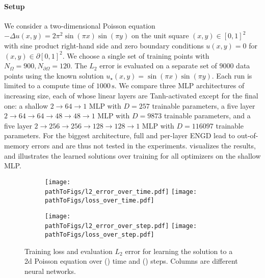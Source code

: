 \paragraph{Setup} We consider a two-dimensional Poisson equation $-\Delta u(x, y) = 2 \pi^2 \sin(\pi x) \sin(\pi y)$ on the unit square $(x,y) \in [0, 1]^2$ with sine product right-hand side and zero boundary conditions $u(x, y) = 0$ for $(x,y) \in \partial [0,1]^2$.
We choose a single set of training points with $N_{\Omega} = 900, N_{\partial\Omega} = 120$.
The $L_2$ error is evaluated on a separate set of $\num{9000}$ data points using the known solution $u_{\star}(x, y) = \sin(\pi x) \sin(\pi y)$.
Each run is limited to a compute time of $\num{1000}\,\text{s}$.
We compare three MLP architectures of increasing size, each of whose linear layers are Tanh-activated except for the final one: a shallow $2\to 64\to 1$ MLP with $D=257$ trainable parameters, a five layer $2 \to 64 \to 64 \to 48 \to 48 \to 1$ MLP with $D=\num{9873}$ trainable parameters, and a five layer $2 \to 256 \to 256\to 128 \to 128 \to 1$ MLP with $D=\num{116097}$ trainable parameters.
For the biggest architecture, full and per-layer ENGD lead to out-of-memory errors and are thus not tested in the experiments.
 visualizes the results, and  illustrates the learned solutions over training for all optimizers on the shallow MLP.

\begin{figure}[!h]
  \centering
  \def\pathToFigs{kfac_pinns_exp/exp17_groupplot_poisson2d}
  \begin{subfigure}[t]{1.0\linewidth}
    \caption{}\label{subfig:poisson2d-time}
    \texttt{[image: \\pathToFigs/l2\_error\_over\_time.pdf]}
    \texttt{[image: \\pathToFigs/loss\_over\_time.pdf]}
  \end{subfigure}
  \begin{subfigure}[t]{1.0\linewidth}
    \caption{}\label{subfig:poisson2d-step}
    \texttt{[image: \\pathToFigs/l2\_error\_over\_step.pdf]}
    \texttt{[image: \\pathToFigs/loss\_over\_step.pdf]}
  \end{subfigure}
  \caption{ Training loss and evaluation $L_2$ error for learning the solution to a 2d Poisson equation over () time and () steps.
    Columns are different neural networks.}\label{fig:poisson2d-appendix}
\end{figure}

